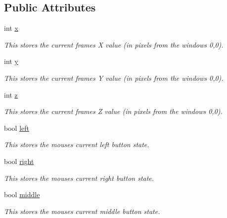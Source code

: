 \subsection*{Public Attributes}
\begin{DoxyCompactItemize}
\item 
int \hyperlink{classc_mouse_a7cf5f6cfeb1d68ad4b97d281503247d8}{x}
\begin{DoxyCompactList}\small\item\em This stores the current frames X value (in pixels from the windows 0,0). \item\end{DoxyCompactList}\item 
int \hyperlink{classc_mouse_ab29c5b17ff87340b22b7bfa1a862b657}{y}
\begin{DoxyCompactList}\small\item\em This stores the current frames Y value (in pixels from the windows 0,0). \item\end{DoxyCompactList}\item 
int \hyperlink{classc_mouse_abd2eb43958c968e29bc01351ca6c82f7}{z}
\begin{DoxyCompactList}\small\item\em This stores the current frames Z value (in pixels from the windows 0,0). \item\end{DoxyCompactList}\item 
bool \hyperlink{classc_mouse_a377c398a74652f24dc4a0082e426fa3b}{left}
\begin{DoxyCompactList}\small\item\em This stores the mouses current left button state. \item\end{DoxyCompactList}\item 
bool \hyperlink{classc_mouse_a78814ee83b22c65e29a643cb46629ec7}{right}
\begin{DoxyCompactList}\small\item\em This stores the mouses current right button state. \item\end{DoxyCompactList}\item 
bool \hyperlink{classc_mouse_a557b3b684fe0afeb1c99ea8f0e0b4225}{middle}
\begin{DoxyCompactList}\small\item\em This stores the mouses current middle button state. \item\end{DoxyCompactList}\item 

\end{DoxyCompactItemize}

